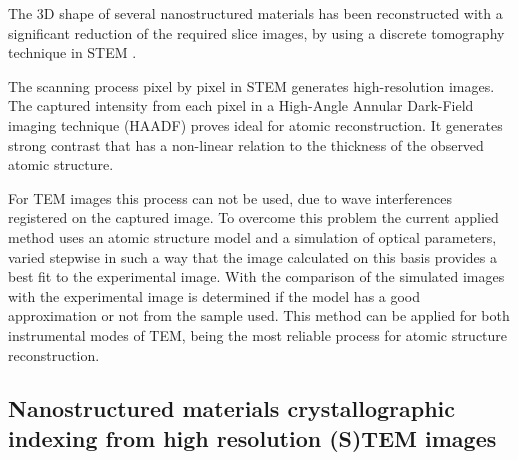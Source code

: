 \documentclass[
  oneside,
  11pt, a4paper,
  footinclude=true,
  headinclude=true,
  cleardoublepage=empty
]{scrbook}
\begin{document}
The 3D shape of several nanostructured materials has been reconstructed  with a significant reduction of the required slice images, by using a discrete tomography technique in
STEM \citep{jinschek20083}.
\par 

The scanning process pixel by pixel in STEM generates high-resolution images. The captured intensity from each pixel in a High-Angle Annular Dark-Field imaging technique (HAADF) proves ideal for atomic reconstruction\citep{jia2014determination}. It generates strong contrast that has a non-linear relation to the thickness of the observed atomic structure.\par 
For TEM images this process can not be used, due to wave interferences registered on the captured image. To overcome this problem the current applied method uses an atomic structure model 
and a simulation of optical parameters,
 varied stepwise in such a way that the image calculated
on this basis provides a best fit to the experimental image. 
 With the comparison of the simulated images with the experimental image is determined if the model has a good approximation or not from the sample used. 
 This method can be applied for both instrumental modes of TEM, being the most reliable process for atomic structure reconstruction.
	
	\subsection{Nanostructured materials crystallographic indexing from high resolution (S)TEM images}
	
\end{document}
